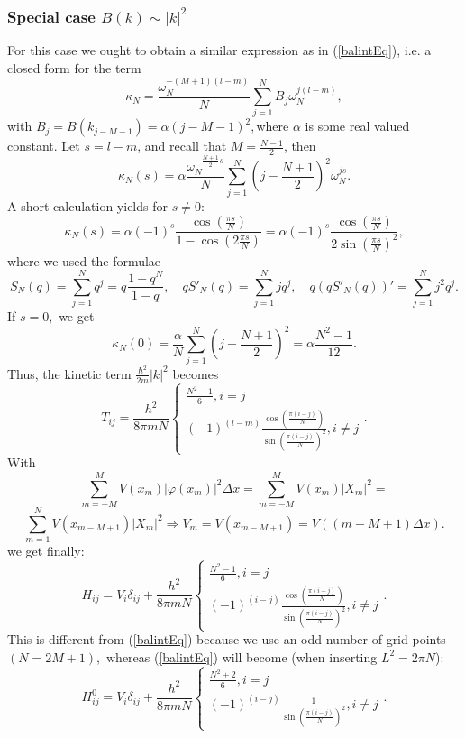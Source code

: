 \documentclass[12pt,a4paper]{article}
\begin{document}
\begin{appendices}
\subsubsection{Special case $B (k) \sim | k |^2$}
For this case we ought to obtain a similar expression as in (\ref{balintEq}), i.e. 
a closed form for the term
\[ \kappa_N = \frac{\omega_N^{- (M + 1)  (l - m)}}{N} \sum_{j = 1}^N B_j
   \omega_N^{j (l - m)}, \]
with $B_j = B (k_{j - M - 1}) = \alpha (j - M - 1)^2,$where $\alpha$ is some
real valued constant. Let $s = l - m$, and recall that $M = \frac{N - 1}{2}$,
then
\[ \kappa_N (s) = \alpha \frac{\omega_N^{- \frac{N + 1}{2} s}}{N} \sum_{j =
   1}^N \left( j - \frac{N + 1}{2} \right)^2 \omega_N^{j s} . \]
A short calculation yields for $s \neq 0 :$
\[ \kappa_N (s) = \alpha (- 1)^s \frac{\cos \left( \frac{\pi s}{N} \right)}{1
   - \cos \left( 2 \frac{\pi s}{N} \right)} = \alpha (- 1)^s
   \frac{\cos \left( \frac{\pi s}{N} \right) }{2 \sin \left( \frac{\pi s}{N}
   \right)^2}, \]
where we used the formulae
\[ S_N (q) = \sum_{j = 1}^N q^j = q^{}  \frac{1 - q^N}{1 - q^{}}, \hspace{1em}
   q S'_N (q) = \sum_{j = 1}^N jq^j, \hspace{1em} q (q S'_N (q))' = \sum_{j =
   1}^N j^2 q^j . \]
If $s = 0,$ we get
\[ \kappa_N (0) = \frac{\alpha}{N} \sum_{j = 1}^N \left( j - \frac{N + 1}{2}
   \right)^2 = \alpha \frac{N^2 - 1}{12} . \]
Thus, the kinetic term $\frac{\hbar^2}{2 m} | k |^2$ becomes
\[ T_{i j} = \frac{h^2}{8 \pi mN}  \left\{ \begin{array}{l}
     \frac{N^2 - 1}{6}, i = j\\
     (- 1)^{(l - m)} \frac{\cos \left( \frac{\pi (i - j)}{N}
     \right) }{\sin \left( \frac{\pi (i - j)}{N} \right)^2}, i \neq j
   \end{array} \right. . \]
With
   \[ \sum_{m = - M}^M V (x_m)  | \varphi (x_m) |^2 \Delta x = \sum_{m = -
      M}^M V (x_m)  | X_m |^2 = \]
   \[ \sum_{m = 1}^N V (x_{m - M + 1})  | X_m |^2 \Rightarrow V_m = V (x_{m -
      M + 1}) = V ((m - M + 1) \Delta x) . \] 
we get finally:
\[ H_{i j} = V_i \delta_{i j} + \frac{h^2}{8 \pi mN}  \left\{ \begin{array}{l}
     \frac{N^2 - 1}{6}, i = j\\
     (- 1)^{(i - j)}  \frac{\cos \left( \frac{\pi (i - j)}{N}
     \right) }{\sin \left( \frac{\pi (i - j)}{N} \right)^2}, i \neq j
   \end{array} \right. . \]
This is different from (\ref{balintEq}) because we use an odd number of grid 
points $(N = 2M + 1),$ whereas (\ref{balintEq}) will become 
(when inserting $L^2 = 2 \pi N$):
 \[ H_{i j}^0 = V_i \delta_{i j} + \frac{h^2}{8 \pi mN}  \left\{
   \begin{array}{l}
     \frac{N^2 + 2}{6}, i = j\\
     (- 1)^{(i - j)}  \frac{1}{\sin \left( \frac{\pi (i -
     j)}{N} \right)^2}, i \neq j
   \end{array} \right. . 
 \]

\end{appendices}
\end{document}
